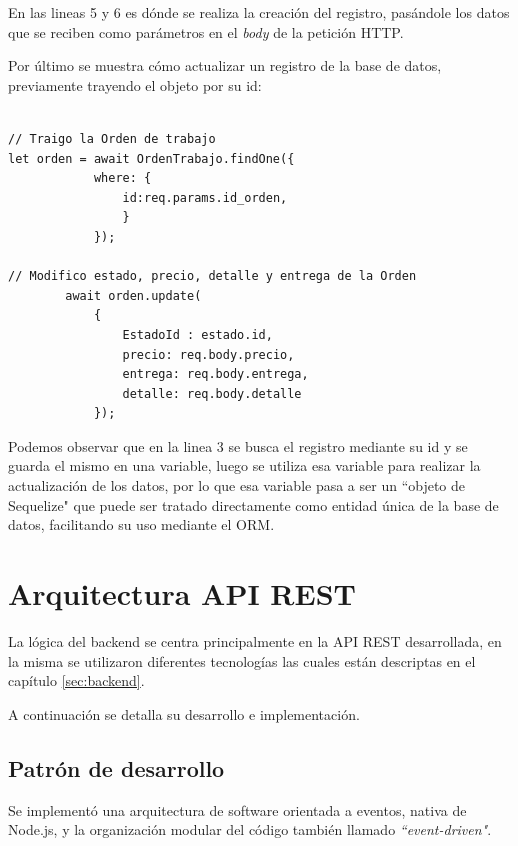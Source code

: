 En las lineas 5 y 6 es dónde se realiza la creación del registro, pasándole los datos que se reciben como parámetros en el \textit{body} de la petición HTTP.

Por último se muestra cómo actualizar un registro de la base de datos, previamente trayendo el objeto por su id:

\begin{lstlisting}[label=cod:updateregistro,caption=Código resumido para actualizar un registro en la base de datos.]

// Traigo la Orden de trabajo
let orden = await OrdenTrabajo.findOne({
            where: {
                id:req.params.id_orden,
                }
            });
            
// Modifico estado, precio, detalle y entrega de la Orden
        await orden.update(
            {
                EstadoId : estado.id,
                precio: req.body.precio,
                entrega: req.body.entrega,
                detalle: req.body.detalle
            });
\end{lstlisting}

Podemos observar que en la linea 3 se busca el registro mediante su id y se guarda el mismo en una variable, luego se utiliza esa variable para realizar la actualización de los datos, por lo que esa variable pasa a ser un ``objeto de Sequelize" que puede ser tratado directamente como entidad única de la base de datos, facilitando su uso mediante el ORM.


\section{Arquitectura API REST}
\label{sec:arquitecturaapirest}

La lógica del backend se centra principalmente en la API REST desarrollada, en la misma se utilizaron diferentes tecnologías las cuales están descriptas en el capítulo \ref{sec:backend}.

A continuación se detalla su desarrollo e implementación.

\subsection{Patrón de desarrollo}
\label{subsec:apipatron}

Se implementó una arquitectura de software orientada a eventos, nativa de Node.js, y la organización modular del código también llamado \textit{``event-driven"}.

